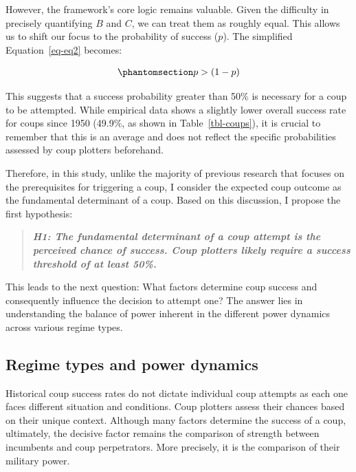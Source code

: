 \documentclass[
  12pt,
]{report}
\begin{document}
However, the framework's core logic remains valuable. Given the
difficulty in precisely quantifying \(B\) and \(C\), we can treat them
as roughly equal. This allows us to shift our focus to the probability
of success (\(p\)). The simplified Equation~\ref{eq-eq2} becomes:

\begin{equation}\phantomsection\label{eq-eq3}{
\begin{aligned}
p > (1-p)
\end{aligned}
}\end{equation}

This suggests that a success probability greater than 50\% is necessary
for a coup to be attempted. While empirical data shows a slightly lower
overall success rate for coups since 1950 (49.9\%, as shown in
Table~\ref{tbl-coups}), it is crucial to remember that this is an
average and does not reflect the specific probabilities assessed by coup
plotters beforehand.

Therefore, in this study, unlike the majority of previous research that
focuses on the prerequisites for triggering a coup, I consider the
expected coup outcome as the fundamental determinant of a coup. Based on
this discussion, I propose the first hypothesis:

\begin{quote}
\textbf{\emph{H1: The fundamental determinant of a coup attempt is the
perceived chance of success. Coup plotters likely require a success
threshold of at least 50\%.}}
\end{quote}

This leads to the next question: What factors determine coup success and
consequently influence the decision to attempt one? The answer lies in
understanding the balance of power inherent in the different power
dynamics across various regime types.

\subsection{Regime types and power
dynamics}\label{regime-types-and-power-dynamics}

Historical coup success rates do not dictate individual coup attempts as
each one faces different situation and conditions. Coup plotters assess
their chances based on their unique context. Although many factors
determine the success of a coup, ultimately, the decisive factor remains
the comparison of strength between incumbents and coup perpetrators.
More precisely, it is the comparison of their military power.
\end{document}
